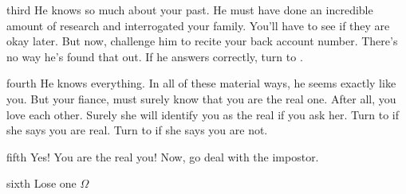 \documentclass[notebook]{guildcamp1}
\begin{document}
\begin{page}{third}
He knows so much about your past. He must have done an incredible amount of research and interrogated your family. You'll have to see if they are okay later. But now, challenge him to recite your back account number.  There's no way he's found that out. If he answers correctly, turn to  .
\end{page}

\begin{page}{fourth}
He knows everything. In all of these material ways, he seems exactly like you. But your fiance, \cBride{} must surely know that you are the real one. After all, you love each other. Surely she will identify you as the real \cGroomB{} if you ask her. Turn to  if she says you are real. Turn to  if she says you are not.
\end{page}

\begin{page}{fifth}
Yes! You are the real you! Now, go deal with the impostor.
\end{page}

\begin{page}{sixth}
  Lose one $\Omega$
  
  \end{page}

\endnotebook
\end{document}
